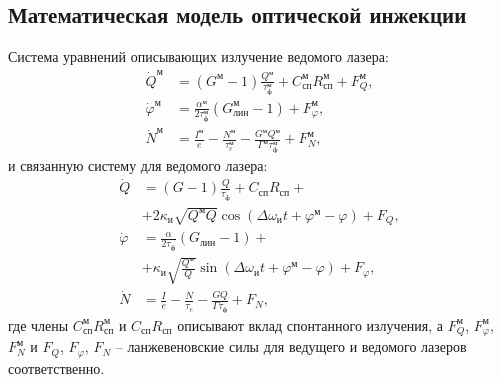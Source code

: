 \subsection{Математическая модель оптической инжекции}
Система уравнений описывающих излучение ведомого лазера:
\begin{equation}\label{eq:systemForMaster}
	\begin{split}
		\dot{Q}^{\text{м}} &= (G^{\text{м}} - 1)\frac{Q^{\text{м}}}{{{\tau_{\text{ф}}^{\text{м}}}}}+ C_{\text{сп}}^{\text{м}} R_{\text{сп}}^{\text{м}} +F_Q^{\text{м}}, \\ 
		\dot{\varphi}^{\text{м}} &= \frac{\alpha^{\text{м}} }{{2{\tau_{\text{ф}}^{\text{м}}}}}(G_{\text{лин}}^{\text{м}} - 1)+F_\varphi^{\text{м}},\\
		\dot{N} ^{\text{м}} &= \frac{I^{\text{м}}}{e} - \frac{N^{\text{м}}}{{{\tau _e^{\text{м}}}}} - \frac{{G^{\text{м}}Q^{\text{м}}}}{{\Gamma^{\text{м}} {\tau_{\text{ф}}^{\text{м}}}}}+F_N^{\text{м}},	
	\end{split}
\end{equation}
и связанную систему для ведомого лазера:
\begin{equation}\label{eq:systemForSlave}
	\boxed{	\begin{split}
			\dot{Q} &= (G - 1)\frac{Q}{{{\tau_{\text{ф}}}}}+ C_{\text{сп}} R_{\text{сп}}+ \\
			&
			+ 2{\kappa_{\text{и}}}\sqrt {Q^{\text{м}}Q} \cos (\Delta \omega_{\text{и}} t + {\varphi ^{\text{м}}} - \varphi )+F_Q, \\ 
			\dot{\varphi} &= \frac{\alpha }{{2{\tau_{\text{ф}}}}}(G_{\text{лин}} - 1)+ \\
			&+ {\kappa_{\text{и}}}\sqrt {\frac{{Q^{\text{м}}}}{Q}} \sin (\Delta \omega_{\text{и}} t + {\varphi^{\text{м}}} - \varphi )+F_\varphi,\\
			\dot{N} &= \frac{I}{e} - \frac{N}{{{\tau _e}}} - \frac{{GQ}}{{\Gamma {\tau_{\text{ф}}}}}+F_N,
	\end{split}}
\end{equation}
где члены $C_{\text{сп}}^{\text{м}}R_{\text{сп}}^{\text{м}}$ и $C_{\text{сп}}R_{\text{сп}}$ описывают вклад спонтанного излучения, а $F_Q^{\text{м}} $, $F_\varphi^{\text{м}}$, $F_N^{\text{м}}$ и $F_Q$, $F_\varphi$, $F_N$ -- ланжевеновские силы для ведущего и ведомого лазеров соответственно.
